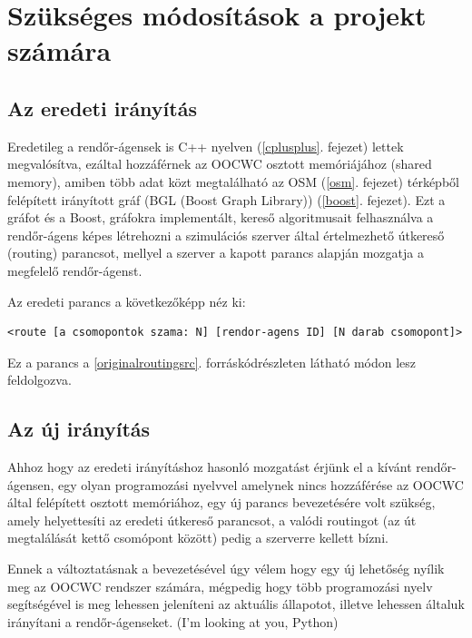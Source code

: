 \documentclass[a4paper,12pt]{report}
\begin{document}
\section{Szükséges módosítások a projekt számára}
\label{changes}

\subsection{Az eredeti irányítás}
\label{originalrouting}

Eredetileg a rendőr-ágensek is C++ nyelven (\ref{cplusplus}. fejezet) lettek megvalósítva, ezáltal hozzáférnek az OOCWC osztott memóriájához (shared memory), amiben több adat közt megtalálható az OSM \citep{osm} (\ref{osm}. fejezet) térképből felépített irányított gráf (BGL (Boost Graph Library)) (\ref{boost}. fejezet). Ezt a gráfot és a Boost, gráfokra implementált, kereső algoritmusait felhasználva a rendőr-ágens képes létrehozni a szimulációs szerver által értelmezhető útkereső (routing) parancsot, mellyel a szerver a kapott parancs alapján mozgatja a megfelelő rendőr-ágenst. 

\vspace{2mm}
Az eredeti parancs a következőképp néz ki: 
\begin{lstlisting}
<route [a csomopontok szama: N] [rendor-agens ID] [N darab csomopont]>
\end{lstlisting}

Ez a parancs a \ref{originalroutingsrc}. forráskódrészleten látható módon lesz feldolgozva.



\subsection{Az új irányítás}
\label{newrouting}

Ahhoz hogy az eredeti irányításhoz hasonló mozgatást érjünk el a kívánt rendőr-ágensen, egy olyan programozási nyelvvel amelynek nincs hozzáférése az OOCWC által felépített osztott memóriához, egy új parancs bevezetésére volt szükség, amely helyettesíti az eredeti útkereső parancsot, a valódi routingot (az út megtalálását kettő csomópont között) pedig a szerverre kellett bízni.

\vspace{2mm}
Ennek a változtatásnak a bevezetésével úgy vélem hogy egy új lehetőség nyílik meg az OOCWC rendszer számára, mégpedig hogy több programozási nyelv segítségével is meg lehessen jeleníteni az aktuális állapotot, illetve lehessen általuk irányítani a rendőr-ágenseket. (I'm looking at you, Python)
\end{document}
